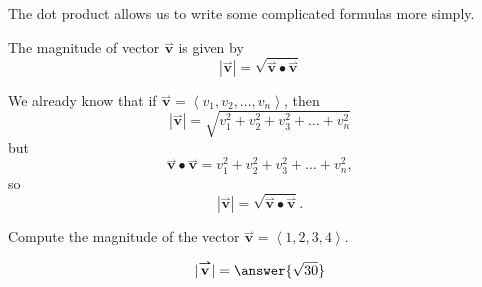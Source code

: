\documentclass{ximera}
\begin{document}
\begin{question}
\begin{question}
    \begin{selectAll}
    \end{selectAll}
  \end{question}
\end{question}

The dot product allows us to write some complicated formulas more simply.

\begin{theorem}
  The magnitude of vector $\overset{\boldsymbol{\rightharpoonup}}{\mathbf{v}}$ is given by
  \[
  |\overset{\boldsymbol{\rightharpoonup}}{\mathbf{v}}|=\sqrt{\overset{\boldsymbol{\rightharpoonup}}{\mathbf{v}}\bullet\overset{\boldsymbol{\rightharpoonup}}{\mathbf{v}}}
  \]
  \begin{explanation}
    We already know that if $\overset{\boldsymbol{\rightharpoonup}}{\mathbf{v}} = \left\langle v_1,v_2,\dots,v_n \right\rangle$,
    then
    \[
    |\overset{\boldsymbol{\rightharpoonup}}{\mathbf{v}}| = \sqrt{v_1^2+v_2^2+v_3^2+\dots+v_n^2}
    \]
    but
    \[
    \overset{\boldsymbol{\rightharpoonup}}{\mathbf{v}} \bullet \overset{\boldsymbol{\rightharpoonup}}{\mathbf{v}} = v_1^2+v_2^2+v_3^2+\dots+v_n^2,
    \]
    so
    \[
    |\overset{\boldsymbol{\rightharpoonup}}{\mathbf{v}}|=\sqrt{\overset{\boldsymbol{\rightharpoonup}}{\mathbf{v}}\bullet\overset{\boldsymbol{\rightharpoonup}}{\mathbf{v}}}.
    \]
  \end{explanation}
\end{theorem}

\begin{question}
  Compute the magnitude of the vector $\overset{\boldsymbol{\rightharpoonup}}{\mathbf{v}} = \left\langle 1,2,3,4 \right\rangle$.
  \begin{prompt}
    \[
    |\overset{\boldsymbol{\rightharpoonup}}{\mathbf{v}}| = \answer{\sqrt{30}}
    \]
  \end{prompt}
\end{question}
\end{document}
